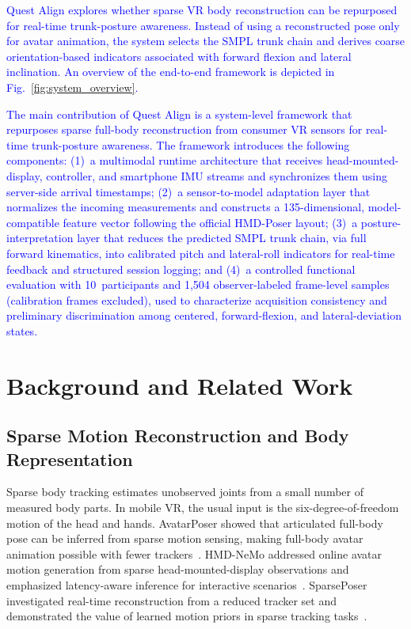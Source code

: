 \documentclass[conference]{IEEEtran}
\newcommand{\CC}[1]{\textcolor{blue}{#1}}
\begin{document}
\CC{Quest Align explores whether sparse VR body reconstruction can be repurposed for
real-time trunk-posture awareness. Instead of using a reconstructed pose only for avatar
animation, the system selects the SMPL trunk chain and derives coarse orientation-based
indicators associated with forward flexion and lateral inclination. An overview of the
end-to-end framework is depicted in
Fig.~\ref{fig:system_overview}.}

\CC{The main contribution of Quest Align is a system-level framework that repurposes sparse
full-body reconstruction from consumer VR sensors for real-time trunk-posture awareness.
The framework introduces the following components: (1)~a multimodal runtime
architecture that receives head-mounted-display, controller, and smartphone IMU
streams and synchronizes them using server-side arrival timestamps; (2)~a sensor-to-model
adaptation layer that normalizes the incoming measurements and constructs a 135-dimensional,
model-compatible feature vector following the official HMD-Poser layout; (3)~a
posture-interpretation layer that reduces the predicted SMPL trunk chain, via full forward
kinematics, into calibrated pitch and lateral-roll indicators for real-time feedback and
structured session logging; and (4)~a controlled functional evaluation with 10~participants
and 1,504 observer-labeled frame-level samples (calibration frames excluded), used to characterize acquisition consistency
and preliminary discrimination among centered, forward-flexion, and lateral-deviation
states.}

\section{Background and Related Work}
\subsection{Sparse Motion Reconstruction and Body Representation}
Sparse body tracking estimates unobserved joints from a small number of measured body
parts. In mobile VR, the usual input is the six-degree-of-freedom motion of the head and
hands. AvatarPoser showed that articulated full-body pose can be inferred from sparse
motion sensing, making full-body avatar animation possible with fewer
trackers~\cite{avatarposer}. HMD-NeMo addressed online avatar motion generation from sparse
head-mounted-display observations and emphasized latency-aware inference for interactive
scenarios~\cite{hmdnemo}. SparsePoser investigated real-time reconstruction from a reduced
tracker set and demonstrated the value of learned motion priors in sparse tracking
tasks~\cite{sparseposer}.
\end{document}
